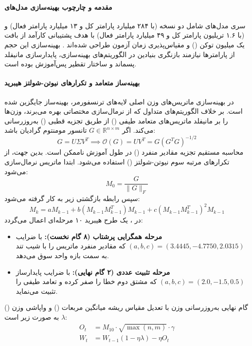 \item {}

\paragraph*{مقدمه و چارچوب بهینه‌سازی مدل‌های }
سری مدل‌های  شامل دو نسخه  (با ۲۸۴ میلیارد پارامتر کل و ۱۳ میلیارد پارامتر فعال) و  (با ۱.۶ تریلیون پارامتر کل و ۴۹ میلیارد پارامتر فعال) با هدف پشتیبانی کارآمد از بافت یک میلیون توکن () و مقیاس‌پذیری زمان آزمون طراحی شده‌اند \cite{deepseek2026v4}. بهینه‌سازی این حجم از پارامترها نیازمند بازنگری بنیادین در الگوریتم‌های بهینه‌سازی، پایدارسازی مانیفلد پسماند و ساختار تقطیر پس‌آموزش بوده است.

\paragraph*{بهینه‌ساز متعامد  و تکرارهای نیوتن-شولتز هیبرید}
در بهینه‌سازی ماتریس‌های وزن اصلی لایه‌های ترنسفورمر، بهینه‌ساز  \cite{jordan2024muon, liu2025muon} جایگزین  شده است. بر خلاف الگوریتم‌های متداول که از نرمال‌سازی مختصاتی بهره می‌برند،  وزن‌ها را بر مانیفلد ماتریس‌های متعامد طیفی () از طریق تجزیه قطبی () به‌روزرسانی می‌کند. اگر $G \in \mathbb{R}^{n \times m}$ تانسور مومنتوم گرادیان باشد:
\begin{equation}
    G = U \Sigma V^T \implies \mathcal{O}(G) = U V^T = G (G^T G)^{-1/2}
\end{equation}
محاسبه مستقیم تجزیه مقادیر منفرد () در طول آموزش ناممکن است. بدین جهت، از تکرارهای مرتبه سوم نیوتن-شولتز () استفاده می‌شود. ابتدا ماتریس نرمال‌سازی می‌شود:
\begin{equation}
    M_0 = \frac{G}{\|G\|_F}
\end{equation}
سپس رابطه بازگشتی زیر به کار گرفته می‌شود:
\begin{equation}
    M_{k} = a M_{k-1} + b (M_{k-1} M_{k-1}^T) M_{k-1} + c (M_{k-1} M_{k-1}^T)^2 M_{k-1}
\end{equation}
در ، یک طرح هیبرید ۱۰ مرحله‌ای اعمال می‌گردد:
\begin{itemize}
    \item \textbf{مرحله همگرایی پرشتاب (۸ گام نخست):} با ضرایب $(a, b, c) = (3.4445, -4.7750, 2.0315)$ که مقادیر منفرد ماتریس را با شیب تند به سمت بازه واحد سوق می‌دهد.
    \item \textbf{مرحله تثبیت عددی (۲ گام نهایی):} با ضرایب پایدارساز $(a, b, c) = (2.0, -1.5, 0.5)$ که مشتق دوم خطا را صفر کرده و تعامد طیفی را تثبیت می‌نماید.
\end{itemize}
گام نهایی به‌روزرسانی وزن با تعدیل مقیاس ریشه میانگین مربعات () و واپاشی وزن () $\lambda$ به صورت زیر است:
\begin{align}
    O_t &= M_{10} \cdot \sqrt{\max(n, m)} \cdot \gamma \\
    W_t &= W_{t-1}(1 - \eta \lambda) - \eta O_t
\end{align}

